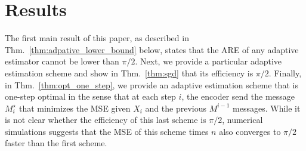 \documentclass[letterpaper, conference,9pt]{IEEEtran}      %
\begin{document}
\section{Results \label{sec:sequential}}
The first main result of this paper, as described in Thm.~\ref{thm:adpative_lower_bound} below, states that the ARE of any adaptive estimator cannot be lower than $\pi/2$. Next, we provide a particular adaptive estimation scheme and show in Thm.~\ref{thm:sgd} that its efficiency is $\pi/2$. Finally, in Thm.~\ref{thm:opt_one_step}, we provide an adaptive estimation scheme that is one-step optimal in the sense that at each step $i$, the encoder send the message $M_i^\star$ that minimizes the MSE given $X_i$ and the previous $M^{i-1}$ messages. While it is not clear whether the efficiency of this last scheme is $\pi/2$, numerical simulations suggests that the MSE of this scheme times $n$ also converges to $\pi/2$ faster than the first scheme.

%  
%
%
%
%  

\end{document}
